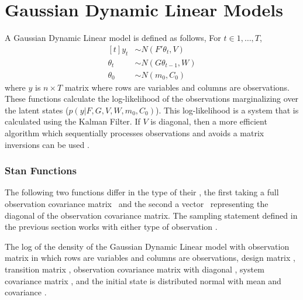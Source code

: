 \section{Gaussian Dynamic Linear Models}

A Gaussian Dynamic Linear model is defined as follows,
For $t \in 1, \dots, T$,
\[
  \begin{aligned}[t]
    y_{t} &\sim N(F' \theta_{t}, V) \\
    \theta_{t} &\sim N(G \theta_{t - 1}, W) \\
    \theta_{0} &\sim N(m_{0}, C_{0})
  \end{aligned}
\]
where $y$ is $n \times T$ matrix where rows are variables and columns
are observations. These functions calculate the log-likelihood of the
observations marginalizing over the latent states ($p(y | F, G, V, W,
m_{0}, C_{0})$). This log-likelihood is a system that is calculated using
the Kalman Filter. If $V$ is diagonal, then a more efficient
algorithm which sequentially processes observations and avoids a
matrix inversions can be used \citep[Sec~6.4]{DurbinKoopman:2001}.


\subsubsection{Stan Functions}

The following two functions differ in the type of their , the
first taking a full observation covariance matrix \ and the
second a vector \ representing the diagonal of the observation
covariance matrix.  The sampling statement defined in the previous
section works with either type of observation .

\begin{description}
%
%
%
 {The log of the density of the Gaussian Dynamic
  Linear model with observation matrix  in which rows are
  variables and columns are observations, design matrix ,
  transition matrix , observation covariance matrix with
  diagonal , system covariance matrix , and the
  initial state is distributed normal with mean  and
  covariance .}
%
\end{description}


